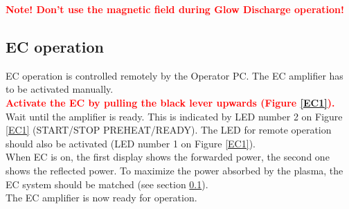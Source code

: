 \documentclass[fleqn,a4paper,20pt]{article}
\begin{document}
\begin{center}
	\textcolor{red}{\textbf{Note! Don’t use the magnetic field during Glow Discharge operation!}}\\
\end{center}
\vspace{0.2cm}


\begin{minipage}{.63\textwidth}

\subsection{EC operation}


EC operation is controlled remotely by the Operator PC. The EC amplifier has to be activated manually.\\

\textcolor{red}{\textbf{Activate the EC by pulling the black lever upwards (Figure \ref{EC1}).}}\\

Wait until the amplifier is ready. This is indicated by LED number 2 on Figure \ref{EC1} (START/STOP PREHEAT/READY). The LED for remote operation should also be activated (LED number 1 on Figure \ref{EC1}).\\

When EC is on, the first display shows the forwarded power, the second one shows the reflected power. To maximize the power absorbed by the plasma, the EC system should be matched (see section \ref{}).\\

The EC amplifier is now ready for operation. 

	
\end{minipage}
\begin{minipage}{.02\textwidth}
	$\ $\\
\end{minipage}
\end{document}
